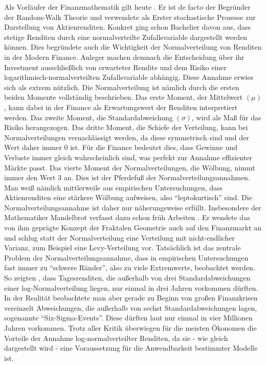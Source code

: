 Als Vorläufer der Finanzmathematik gilt heute \textcite{Bachelier1900}. Er ist de facto der Begründer der Random-Walk Theorie und verwendete als Erster stochastische Prozesse zur Darstellung von Aktienrenditen. Konkret ging schon Bachelier davon aus, dass stetige Renditen durch eine normalverteilte Zufallsvariable dargestellt werden können. Dies begründete auch die Wichtigkeit der Normalverteilung von Renditen in der Modern Finance. Anleger machen demnach die Entscheidung über ihr Investment ausschließlich von erwarteter Rendite und dem Risiko einer logarithmisch-normalverteilten Zufallsvariable abhängig. Diese Annahme erwies sich als extrem nützlich. Die Normalverteilung ist nämlich durch die ersten beiden Momente vollständig beschrieben. Das erste Moment, der Mittelwert $(\mu)$, kann dabei in der Finance als Erwartungswert der Renditen interpretiert werden. Das zweite Moment, die Standardabweichung $(\sigma)$, wird als Maß für das Risiko herangezogen. Das dritte Moment, die Schiefe der Verteilung, kann bei Normalverteilungen vernachlässigt werden, da diese symmetrisch sind und der Wert daher immer 0 ist. Für die Finance bedeutet dies, dass Gewinne und Verluste immer gleich wahrscheinlich sind, was perfekt zur Annahme effizienter Märkte passt. Das vierte Moment der Normalverteilungen, die Wölbung, nimmt immer den Wert 3 an. Dies ist der Pferdefuß der Normalverteilungsannahmen. Man weiß nämlich mittlerweile aus empirischen Untersuchungen, dass Aktienrenditen eine stärkere Wölbung aufweisen, also "`leptokurtisch"' sind. Die Normalverteilungsannahme ist daher nur näherungsweise erfüllt. Insbesondere der Mathematiker Mandelbrot verfasst dazu schon früh Arbeiten \parencite{Mandelbrot1963}. Er wendete das von ihm geprägte Konzept der Fraktalen Geometrie auch auf den Finanzmarkt an und schlug statt der Normalverteilung eine Verteilung mit nicht-endlicher Varianz, zum Beispiel eine Levy-Verteilung vor. Tatsächlich ist das zentrale Problem der Normalverteilungsannahme, dass in empirischen Untersuchungen fast immer zu "`schwere Ränder"', also zu viele Extremwerte, beobachtet werden. So zeigten \textcite{Dowd2008}, dass Tagesrenditen, die außerhalb von drei Standardabweichungen einer log-Normalverteilung liegen, nur einmal in drei Jahren vorkommen dürften. In der Realität beobachtete man aber gerade zu Beginn von großen Finanzkrisen vereinzelt Abweichungen, die außerhalb von sechst Standardabweichungen lagen, sogenannte "`Six-Sigma-Events"'. Diese dürften laut \textcite{Dowd2008} nur einmal in vier Millionen Jahren vorkommen. Trotz aller Kritik überwiegen für die meisten Ökonomen die Vorteile der Annahme log-normalverteilter Renditen, da sie - wie gleich dargestellt wird - eine Voraussetzung für die Anwendbarkeit bestimmter Modelle ist.

